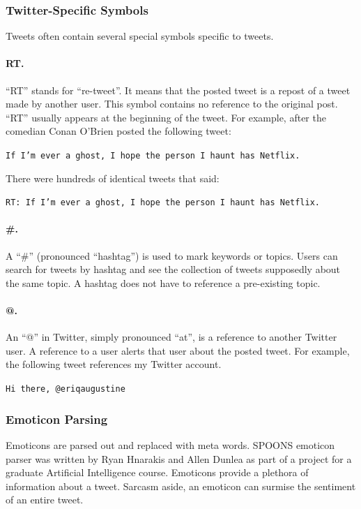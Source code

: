 \documentclass[12pt]{ucthesis}
\begin{document}
\subsubsection{Twitter-Specific Symbols}
\label{class-filter-twitter-symbols}
Tweets often contain several special symbols specific to tweets.

\paragraph{RT.}
\label{class-twitter-symbols-rt}
``RT'' stands for ``re-tweet''. It means that the posted tweet is a repost of
a tweet made by another user. This symbol contains no reference to the original post.
``RT'' usually appears at the beginning of the tweet. For example, after the comedian
Conan O'Brien posted the following tweet:

\begin{center}
   \texttt{If I'm ever a ghost, I hope the person I haunt has Netflix.}
\end{center}

There were hundreds of identical tweets that said:

\begin{center}
   \texttt{RT: If I'm ever a ghost, I hope the person I haunt has Netflix.}
\end{center}

\paragraph{\#.}
\label{class-twitter-symbols-hash}
A ``\#'' (pronounced ``hashtag'') is used to mark keywords or topics.
Users can search for tweets by hashtag and see the collection of tweets supposedly about the
same topic. A hashtag does not have to reference a pre-existing topic.

\paragraph{@.}
\label{class-twitter-symbols-at}
An ``@'' in Twitter, simply pronounced ``at'', is a reference to another Twitter user.
A reference to a user alerts that user about the posted tweet.
For example, the following tweet references my Twitter account.

\begin{center}
   \texttt{Hi there, @eriqaugustine}
\end{center}

\subsubsection{Emoticon Parsing}
\label{class-filter-emoticon}
Emoticons are parsed out and replaced with meta words.
SPOONS emoticon parser was written by Ryan Hnarakis and Allen Dunlea as part of a project for a graduate Artificial Intelligence course.
Emoticons provide a plethora of information about a tweet. Sarcasm aside,
an emoticon can surmise the sentiment of an entire tweet.
\end{document}
